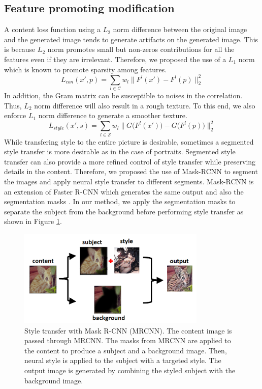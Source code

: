 \documentclass{article}
\begin{document}
\subsection{Feature promoting modification}
A content loss function using a $L_2$ norm difference between the original image and the generated image tends to generate artifacts on the generated image. This is because $L_2$ norm promotes small but non-zeros contributions for all the features even if they are irrelevant. Therefore, we proposed the use of a $L_1$ norm which is known to promote sparsity among features.
\begin{equation}
    L_{con}(x',p) = \sum_{l\in \mathcal{C}} w_l\bigg\|F^{l}(x')-F^{l}(p)\bigg\|^2_2
\end{equation}
In addition, the Gram matrix can be susceptible to noises in the correlation. Thus, $L_2$ norm difference will also result in a rough texture. To this end, we also enforce $L_1$ norm difference to generate a smoother texture.
\begin{equation}
  L_{style}(x',s) = \sum_{l\in \mathcal{S}} w_l\bigg\|G\big(F^{l}(x')\big)-G\big(F^{l}(p)\big)\bigg\|^2_2
\end{equation}
While transfering style to the entire picture is desirable, sometimes a segmented style transfer is more desirable as in the case of portraits. Segmented style transfer can also provide a more refined control of style transfer while preserving details in the content. Therefore, we proposed the use of Mask-RCNN to segment the images and apply neural style transfer to different segments. Mask-RCNN is an extension of Faster R-CNN which generates the same output and also the segmentation masks \cite{MaskRCNN}. In our method, we apply the segmentation masks to separate the subject from the background before performing style transfer as shown in Figure \ref{fig:mrcnn}.

\begin{figure}[t]
  \centering
  \includegraphics[width=0.8\textwidth, height=0.15\textheight]{figure/mrcnn.png}
  \caption{Style transfer with Mask R-CNN (MRCNN). The content image is passed through MRCNN. The masks from MRCNN are applied to the content to produce a subject and a background image. Then, neural style is applied to the subject with a targeted style. The output image is generated by combining the styled subject with the background image.}
  \label{fig:mrcnn}
\end{figure}
\end{document}
